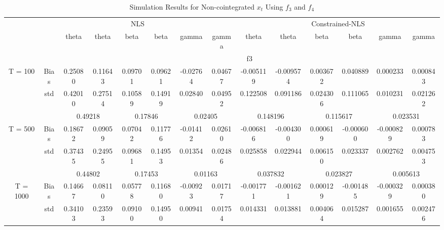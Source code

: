 \documentclass[a4paper,12pt,times,numbered,print,index]{report}
\numberwithin{equation}{section}
\begin{document}
\begin{table}[htbp]
	\centering
	\caption{Simulation Results for Non-cointegrated $x_t$ Using $f_3$ and $f_4$}
	\begin{adjustbox}{max width=\textwidth}
	\begin{tabular}{cccccccccccccc}
		\toprule
		& \multicolumn{7}{c}{NLS}                               & \multicolumn{6}{c}{Constrained-NLS} \\
		&       & theta & theta & beta  & beta  & gamma & gamma & theta & theta & beta  & beta  & gamma & gamma \\
		\midrule
		&       & \multicolumn{12}{c}{f3} \\
		\midrule
		\multirow{3}[1]{*}{T = 100} & Bias  & \textcolor[rgb]{ 0,  .439,  .753}{0.25080} & 0.11643 & 0.09701 & 0.09621 & -0.02764 & 0.04677 & \textcolor[rgb]{ 0,  .439,  .753}{-0.005119} & -0.009574 & 0.003672 & 0.040889 & 0.000233 & 0.000843 \\
		& std   & 0.42010 & 0.27514 & 0.10589 & 0.14919 & 0.02840 & 0.04952 & 0.122508 & 0.091186 & 0.024306 & 0.111065 & 0.010231 & 0.021262 \\
		&       & \multicolumn{2}{c}{0.49218} & \multicolumn{2}{c}{0.17846} & \multicolumn{2}{c}{0.02405} & \multicolumn{2}{c}{0.148196} & \multicolumn{2}{c}{0.115617} & \multicolumn{2}{c}{0.023531} \\
		\multirow{3}[0]{*}{T = 500} & Bias  & \textcolor[rgb]{ 0,  .439,  .753}{0.18672} & 0.09059 & 0.07042 & 0.11776 & -0.01412 & 0.02610 & \textcolor[rgb]{ 0,  .439,  .753}{-0.006816} & -0.004300 & 0.000619 & -0.000600 & -0.000829 & 0.000783 \\
		& std   & 0.37435 & 0.24955 & 0.09681 & 0.14953 & 0.01354 & 0.02486 & 0.025858 & 0.022944 & 0.006150 & 0.023337 & 0.002762 & 0.004753 \\
		&       & \multicolumn{2}{c}{0.44802} & \multicolumn{2}{c}{0.17453} & \multicolumn{2}{c}{0.01163} & \multicolumn{2}{c}{0.037832} & \multicolumn{2}{c}{0.023827} & \multicolumn{2}{c}{0.005613} \\
		\multirow{3}[1]{*}{T = 1000} & Bias  & \textcolor[rgb]{ 0,  .439,  .753}{0.14667} & 0.08110 & 0.05778 & 0.11680 & -0.00923 & 0.01717 & \textcolor[rgb]{ 0,  .439,  .753}{-0.001771} & -0.001621 & 0.000129 & -0.001485 & -0.000329 & 0.000380 \\
		& std   & 0.34103 & 0.23593 & 0.09100 & 0.14950 & 0.00941 & 0.01754 & 0.014331 & 0.013881 & 0.004064 & 0.015287 & 0.001655 & 0.002476 \\

\end{tabular}
\end{adjustbox}
\end{table}
\end{document}
